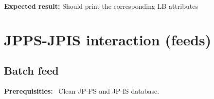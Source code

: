 \documentclass{egee}
\def\req{\noindent\textbf{Prerequisities: }}
\def\result{\noindent\textbf{Expected result: }}
\begin{document}
\result Should print the corresponding LB attributes

\section{JPPS-JPIS interaction (feeds)}





\subsection{Batch feed}

\req\ Clean JP-PS and JP-IS database.
\end{document}
